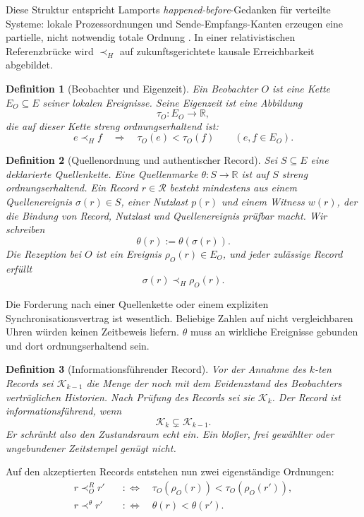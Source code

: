 \documentclass[11pt,a4paper]{article}
\newtheorem{definition}{Definition}[section]
\theoremstyle{remark}
\newcommand{\host}{\prec_{\!H}}
\newcommand{\recv}{\prec_{\!O}^{R}}
\newcommand{\sourceord}{\prec^{\theta}}
\newcommand{\records}{\mathcal{R}}
\newcommand{\histories}{\mathcal{K}}
\begin{document}
Diese Struktur entspricht Lamports \emph{happened-before}-Gedanken für
verteilte Systeme: lokale Prozessordnungen und Sende-Empfangs-Kanten erzeugen
eine partielle, nicht notwendig totale Ordnung \cite{Lamport1978}. In einer
relativistischen Referenzbrücke wird \(\host\) auf zukunftsgerichtete kausale
Erreichbarkeit abgebildet.

\begin{definition}[Beobachter und Eigenzeit]
Ein Beobachter \(O\) ist eine Kette \(E_O\subseteq E\) seiner lokalen
Ereignisse. Seine Eigenzeit ist eine Abbildung
\[
  \tau_O:E_O\longrightarrow\mathbb{R},
\]
die auf dieser Kette streng ordnungserhaltend ist:
\[
  e\host f\quad\Longrightarrow\quad \tau_O(e)<\tau_O(f)
  \qquad(e,f\in E_O).
\]
\end{definition}

\begin{definition}[Quellenordnung und authentischer Record]
Sei \(S\subseteq E\) eine deklarierte Quellenkette. Eine Quellenmarke
\(\theta:S\to\mathbb{R}\) ist auf \(S\) streng ordnungserhaltend. Ein Record
\(r\in\records\) besteht mindestens aus einem Quellenereignis \(\sigma(r)\in
S\), einer Nutzlast \(p(r)\) und einem Witness \(w(r)\), der die Bindung von
Record, Nutzlast und Quellenereignis prüfbar macht. Wir schreiben
\[
  \theta(r):=\theta(\sigma(r)).
\]
Die Rezeption bei \(O\) ist ein Ereignis \(\rho_O(r)\in E_O\), und jeder
zulässige Record erfüllt
\[
  \sigma(r)\host\rho_O(r).
\]
\end{definition}

Die Forderung nach einer Quellenkette oder einem expliziten
Synchronisationsvertrag ist wesentlich. Beliebige Zahlen auf nicht
vergleichbaren Uhren würden keinen Zeitbeweis liefern. \(\theta\) muss an
wirkliche Ereignisse gebunden und dort ordnungserhaltend sein.

\begin{definition}[Informationsführender Record]
Vor der Annahme des \(k\)-ten Records sei \(\histories_{k-1}\) die Menge der
noch mit dem Evidenzstand des Beobachters verträglichen Historien. Nach
Prüfung des Records sei sie \(\histories_k\). Der Record ist
\emph{informationsführend}, wenn
\[
  \histories_k\subsetneq\histories_{k-1}.
\]
Er schränkt also den Zustandsraum echt ein. Ein bloßer, frei gewählter oder
ungebundener Zeitstempel genügt nicht.
\end{definition}

Auf den akzeptierten Records entstehen nun zwei eigenständige Ordnungen:
\begin{align*}
  r\recv r' &\quad:\Longleftrightarrow\quad
  \tau_O(\rho_O(r))<\tau_O(\rho_O(r')),\\
  r\sourceord r' &\quad:\Longleftrightarrow\quad
  \theta(r)<\theta(r').
\end{align*}
\end{document}
